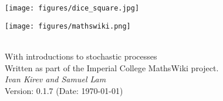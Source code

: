 \hypersetup{pageanchor=false}
\begin{titlepage}
  \texttt{[image: figures/dice\_square.jpg]}
  \colorbox{imperialorange}{\makebox[\linewidth][c]{\shortstack[c]{\vspace{0.5in}}}} \\[4ex]
  \begin{center}
  \begin{minipage}[l]{0.25\linewidth}
     \texttt{[image: figures/mathswiki.png]}
  \end{minipage}
  \hspace{.05\linewidth}
  \begin{minipage}[l]{0.5\linewidth}
    { \\[.5ex]
    {\Large With introductions to stochastic processes} \\[.5ex]
    {\normalsize Written as part of the Imperial College MathsWiki project.} \\[4ex]
    \textit{\large Ivan Kirev and Samuel Lam} \\[1ex]
    Version: 0.1.7 (Date: \today)}
  \end{minipage}
  \end{center}
\end{titlepage}

\restoregeometry
\newpage 

\thispagestyle{empty}
\phantom{This page has been left intentionally blank.}
\newpage